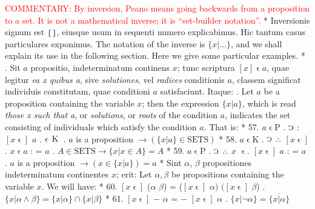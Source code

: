 \documentclass{book}
\newcommand{\C}{\mathop{\sbox0{$\displaystyle$$\reflectbox{C}$} %
\raisebox{-\height+\ht0-0.05cm}[\ht0][\dp0]{\scalebox{0.8}[0.8]{\copy0}}}\displaylimits} %
\newcommand{\pppNoSpace}{\leavevmode\lower0ex\hbox{.}\kern-0.1em\raise0.7ex\hbox{.}\kern-0.1em\lower0ex\hbox{.}} %
\newcommand{\smallIn}{\ensuremath{\mathrel{\epsilon}}}
\newcommand{\K}{\mathop{\thinspace \text{K} \thinspace}}
\newcommand{\setOfSets}{\mathord{\text{SETS}}}
\newcommand\commentary[1]{\textcolor{red}{COMMENTARY: #1}}
\newenvironment{translateTwoCol}
               { %
                 \columnratio{0.5, 0.5} \begin{paracol}{2}
                 \newcommand{\LAT}{\switchcolumn[0]*}
                 \newcommand{\ENG}{\switchcolumn[1]}
               }
               { %
                 \let\ENG\undefined
                 \let\LAT\undefined
                 \end{paracol}
               }
\begin{document}
\begin{translateTwoCol}
\ENG
\commentary{By inversion, Peano means going backwards from a proposition to a set.  It is not a mathematical inverse; it is ``set-builder notation''. }
\LAT  
\quad Inversionis signum est $\scalebox{1.5}[0.8]{[\scalebox{0.2}{ \ }]}$, eiusque usum in sequenti numero explicabimus. Hic tantum casus particulares exponimus.
\ENG
\quad The notation of the inverse is $\{x | \ldots\}$, and we shall explain its use in the following section. Here we give some particular examples.  %
\LAT
{}. Sit $a$ propositio, indeterminatum continens $x$; tunc scriptura $[x] \smallIn a$, quae legitur \emph{ea x quibus a}, sive {\emph{solutiones}}, vel {\emph{radices}} conditionis $a$, classem significat individuis constitutam, quae conditioni $a$ satisfaciunt. Itaque:
\ENG
{}. Let $a$ be a proposition containing the variable $x$; then the expression $\{ x | a \}$, which is read {\emph{those x such that a}}, or {\emph{solutions}}, or {\emph{roots}} of the condition $a$, indicates the set consisting of individuals which satisfy the condition $a$. That is:
\LAT
57. \hspace{0.67cm} $a \smallIn \text{P}$ . $\C$ : $[x\smallIn]$ $a$ . $\smallIn \K$
\ENG
57. \hspace{0.67cm} $a$ is a {\scriptsize proposition} $\rightarrow ( \{x | a \} \in \setOfSets )$ 
\LAT
58. \hspace{0.67cm} $a \smallIn \text{K}$ . $\C$ $\pppNoSpace$ $[x\smallIn]$ . $x \smallIn a$ : = $a$
\ENG
58. \hspace{0.67cm} $A \in \setOfSets \rightarrow \{ x | x \in A \} = A $
\LAT
59. \hspace{0.67cm} $a \smallIn \text{P}$ . $\C$ $\pppNoSpace$ $x$ \smallIn . $[x\smallIn]$ $a$ : = $a$
\ENG
59. \hspace{0.67cm}  $a$ is a {\scriptsize proposition} $\rightarrow (x \in \{x | a \}) = a$
\LAT
\quad Sint $\alpha$, $\beta$ propositiones indeterminatum continentes $x$; erit:
\ENG
\quad Let $\alpha, \beta$ be propositions containing the variable $x$. We will have:
\LAT
60. \hspace{0.67cm} $[x\smallIn]$ ($\alpha$ $\beta$) = ($[x\smallIn]$ $\alpha)$ $([x\smallIn]$ $\beta$)
\ENG
60. \hspace{0.67cm} $\{x | \alpha \wedge \beta\}=\{x|\alpha\} \cap \{x | \beta\}$
\LAT
61. \hspace{0.67cm} $[x\smallIn]$ $-$ $\alpha$ = $-$ $[x\smallIn]$ $\alpha$
\ENG
61. \hspace{0.67cm} $\{x | \neg \alpha \} = \overline{\{x | \alpha\}}$

\end{translateTwoCol}
\end{document}
